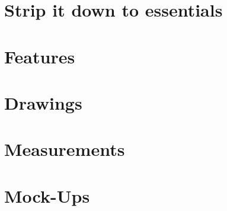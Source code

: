 \section{Strip it down to essentials}


\section{Features}


\section{Drawings}


\section{Measurements}

\section{Mock-Ups}
